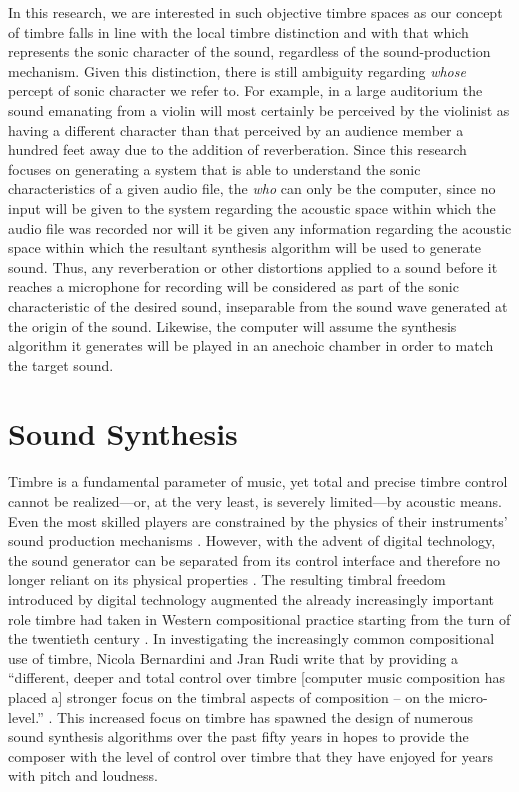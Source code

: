 \documentclass[a4paper,12pt]{report} 	%
\numberwithin{figure}{chapter}
\numberwithin{table}{chapter}
\numberwithin{equation}{chapter}
\begin{document}
\begin{flushleft}
In this research, we are interested in such objective timbre spaces as our concept of timbre falls in line with the local timbre distinction and with that which represents the sonic character of the sound, regardless of the sound-production mechanism. Given this distinction, there is still ambiguity regarding \emph{whose} percept of sonic character we refer to. For example, in a large auditorium the sound emanating from a violin will most certainly be perceived by the violinist as having a different character than that perceived by an audience member a hundred feet away due to the addition of reverberation. Since this research focuses on generating a system  that is able to understand the sonic characteristics of a given audio file, the \emph{who} can only be the computer, since no input will be given to the system regarding the acoustic space within which the audio file was recorded nor will it be given any information regarding the acoustic space within which the resultant synthesis algorithm will be used to generate sound. Thus, any reverberation or other distortions applied to a sound before it reaches a microphone for recording will be considered as part of the sonic characteristic of the desired sound, inseparable from the sound wave generated at the origin of the sound. Likewise, the computer will assume the synthesis algorithm it generates will be played in an anechoic chamber in order to match the target sound.

\section{Sound Synthesis}
Timbre is a fundamental parameter of music, yet total and precise timbre control cannot be realized---or, at the very least, is severely limited---by acoustic means. Even the most skilled players are constrained by the physics of their instruments' sound production mechanisms \cite[p. 11]{Wessel:2002uk}. However, with the advent of digital technology, the sound generator can be separated from its control interface and therefore no longer reliant on its physical properties \cite[p. 1]{Malloch:2006jb}. The resulting timbral freedom introduced by digital technology augmented the already increasingly important role timbre had taken in Western compositional practice starting from the turn of the twentieth century \cite[p. 1]{Klingbeil:2009lo}. In investigating the increasingly common compositional use of timbre, Nicola Bernardini and Jran Rudi write that by providing a ``different, deeper and total control over timbre [computer music composition has placed a] stronger focus on the timbral aspects of composition -- on the micro-level.'' \cite[p. 3]{Bernardini:2001kc}. This increased focus on timbre has spawned the design of numerous sound synthesis algorithms over the past fifty years in hopes to provide the composer with the level of control over timbre that they have enjoyed for years with pitch and loudness.


\end{flushleft}
\end{document}

